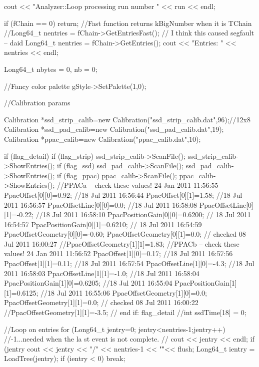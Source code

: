 \begin{DoxyCode}
{
  cout << "Analyzer::Loop processing run number " << run << endl;

  if (fChain == 0) return;
  //Fast function returns kBigNumber when it is TChain
  //Long64_t nentries = fChain->GetEntriesFast(); // I think this caused segfault
       -- daid
  Long64_t nentries = fChain->GetEntries();
   cout << "Entries: " << nentries << endl;

   Long64_t nbytes = 0, nb = 0;

   //Fancy color palette
   gStyle->SetPalette(1,0);

   //Calibration params

   Calibration *ssd_strip_calib=new Calibration("ssd_strip_calib.dat",96);//12x8
   Calibration *ssd_pad_calib=new Calibration("ssd_pad_calib.dat",19);
   Calibration *ppac_calib=new Calibration("ppac_calib.dat",10);
   
   if (flag_detail){
     if (flag_strip){
       ssd_strip_calib->ScanFile();
       ssd_strip_calib->ShowEntries();
     }
     if (flag_ssd){
       ssd_pad_calib->ScanFile();
       ssd_pad_calib->ShowEntries();
     }
     if (flag_ppac){
       ppac_calib->ScanFile();
       ppac_calib->ShowEntries();
       //PPACa -- check these values! 24 Jan 2011 11:56:55 
       PpacOffset[0][0]=0.92; //18 Jul 2011 16:56:44 
       PpacOffset[0][1]=1.58; //18 Jul 2011 16:56:57 
       PpacOffsetLine[0][0]=0.0; //18 Jul 2011 16:58:08 
       PpacOffsetLine[0][1]=-0.22; //18 Jul 2011 16:58:10 
       PpacPositionGain[0][0]=0.6200; // 18 Jul 2011 16:54:57 
       PpacPositionGain[0][1]=0.6210; // 18 Jul 2011 16:54:59 
       PpacOffsetGeometry[0][0]=-0.60;
       PpacOffsetGeometry[0][1]=0.0; // checked 08 Jul 2011 16:00:27 
       //PpacOffsetGeometry[1][1]=1.83;
       //PPACb -- check these values! 24 Jan 2011 11:56:52 
       PpacOffset[1][0]=0.17; //18 Jul 2011 16:57:56 
       PpacOffset[1][1]=0.11; //18 Jul 2011 16:57:54 
       PpacOffsetLine[1][0]=-4.3; //18 Jul 2011 16:58:03 
       PpacOffsetLine[1][1]=-1.0; //18 Jul 2011 16:58:04 
       PpacPositionGain[1][0]=0.6205; //18 Jul 2011 16:55:04 
       PpacPositionGain[1][1]=0.6125; //18 Jul 2011 16:55:06 
       PpacOffsetGeometry[1][0]=0.0;
       PpacOffsetGeometry[1][1]=0.0; // checked 08 Jul 2011 16:00:22 
       //PpacOffsetGeometry[1][1]=-3.5;
     }
   } // end if: flag_detail
   //int ssdTime[18] = {0};

   //Loop on entries
   for (Long64_t jentry=0; jentry<nentries-1;jentry++) {//-1...needed when the la
      st event is not complete.
   // cout << jentry << endl;
      if (jentry%
         cout << jentry << "/" << nentries-1 << "\r"<< flush;
      }
      Long64_t ientry = LoadTree(jentry);
      if (ientry < 0) break;

}
\end{DoxyCode}
